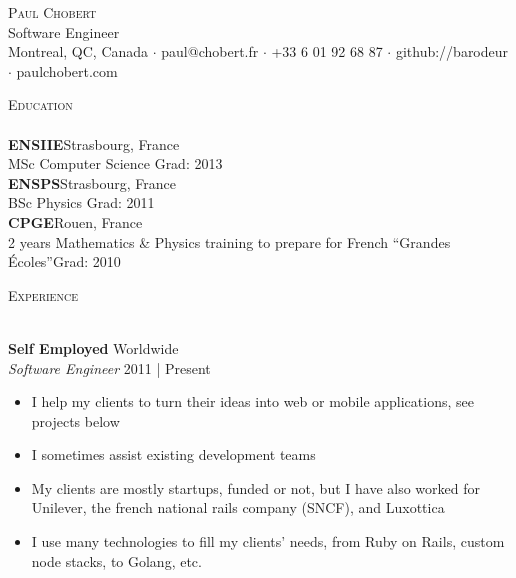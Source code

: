 \documentclass[a4paper]{article}
\newcommand{\lineunder} {
    \vspace*{-8pt} \\
    \hspace*{-18pt} \hrulefill \\
}
\newcommand{\header} [1] {
    {\hspace*{-18pt}\vspace*{6pt} \textsc{#1}}
    \vspace*{-6pt} \lineunder
}
\begin{document}
\vspace*{-40pt}

\vspace*{-10pt}
\begin{center}
    {\Huge \scshape {Paul Chobert}}\\
    Software Engineer\\
	Montreal, QC, Canada $\cdot$ paul@chobert.fr $\cdot$ +33 6 01 92 68 87 $\cdot$ github://barodeur $\cdot$ paulchobert.com\\
\end{center}

\vspace*{2mm}

\header{Education}
\textbf{ENSIIE}\hfill Strasbourg, France\\
MSc Computer Science \hfill Grad: 2013\\
\vspace{2mm}
\textbf{ENSPS}\hfill Strasbourg, France\\
BSc Physics \hfill Grad: 2011\\
\vspace{2mm}
\textbf{CPGE}\hfill Rouen, France\\
2 years Mathematics \& Physics training to prepare for French “Grandes Écoles”\hfill Grad: 2010\\
\vspace{2mm}

\vspace*{2mm}

\header{Experience}
\vspace{1mm}

\textbf{Self Employed} \hfill Worldwide\\
\textit{Software Engineer} \hfill 2011 | Present\\
\vspace{-1mm}
\begin{itemize} \itemsep 1pt
    \item I help my clients to turn their ideas into web or mobile applications, see projects below
    \item I sometimes assist existing development teams
    \item My clients are mostly startups, funded or not, but I have also worked for Unilever,
        the french national rails company (SNCF), and Luxottica
    \item I use many technologies to fill my clients' needs, from Ruby on Rails,
        custom node stacks, to Golang, etc.
\end{itemize}
\end{document}
